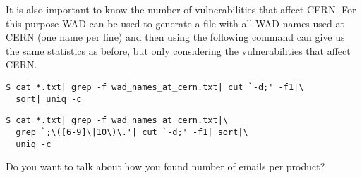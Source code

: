 It is also important to know the number of vulnerabilities that affect CERN. For this purpose WAD can be used to generate a file with all WAD names used at CERN (one name per line) and then using the following command can give us the same statistics as before, but only considering the vulnerabilities that affect CERN.
\begin{framed}
\begin{verbatim}
$ cat *.txt| grep -f wad_names_at_cern.txt| cut `-d;' -f1|\
  sort| uniq -c
\end{verbatim}
\end{framed}
\begin{framed}
\begin{verbatim}
$ cat *.txt| grep -f wad_names_at_cern.txt|\
  grep `;\([6-9]\|10\)\.'| cut `-d;' -f1| sort|\
  uniq -c
\end{verbatim}
\end{framed}
%
%
Do you want to talk about how you found number of emails per product?


